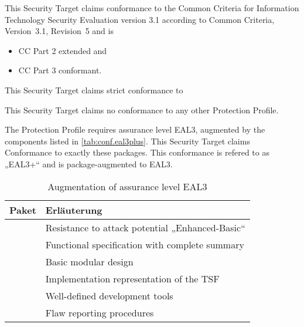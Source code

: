 

This Security Target claims conformance to the Common Criteria for
Information Technology Security Evaluation version 3.1 according to Common
Criteria, Version~3.1, Revision~5 and is

\begin{itemize}
\item CC Part 2 \autocite{CCPart2} extended and
\item CC Part 3 \autocite{CCPart3} conformant.
\end{itemize}


This Security Target claims strict conformance to


This Security Target claims no conformance to any other Protection
Profile.


The Protection Profile requires assurance level EAL3, augmented by the
components listed in \autoref{tab:conf.eal3plus}. This Security Target claims
Conformance to exactly these packages. This conformance is refered to as „EAL3+“
and is package-augmented to EAL3.

\begin{table}[htbp]
  \centering
  \begin{tabularx}{0.7\textwidth}{@{}lY@{}}
    \toprule
    Paket & Erläuterung \\
    \midrule
     & Resistance to attack potential „Enhanced-Basic“\\
     & Functional specification with complete summary\\
     & Basic modular design\\
     & Implementation representation of the TSF\\
     & Well-defined development tools\\
     & Flaw reporting procedures\\
    \bottomrule
  \end{tabularx}
  \caption{Augmentation of assurance level EAL3}
  \label{tab:conf.eal3plus}
\end{table}

